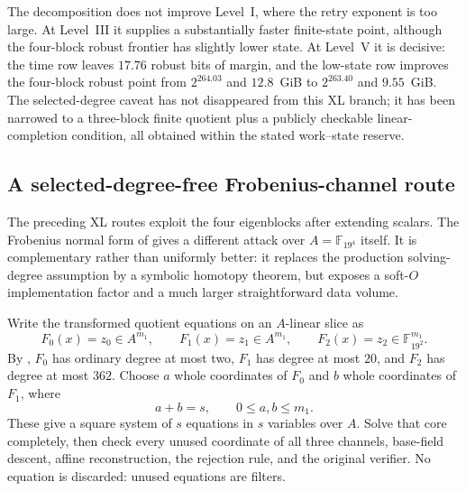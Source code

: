 \documentclass[11pt]{article}
\newcommand{\F}{\mathbb F}
\begin{document}
The decomposition does not improve Level~I, where the retry exponent is too
large.  At Level~III it supplies a substantially faster finite-state point,
although the four-block robust frontier has slightly lower state.  At
Level~V it is decisive: the time row leaves $17.76$ robust bits of margin, and
the low-state row improves the four-block robust point from $2^{264.03}$ and
$12.8$~GiB to $2^{263.40}$ and $9.55$~GiB.  The selected-degree caveat has not disappeared from this XL branch; it has
been narrowed to a three-block finite quotient plus a publicly checkable linear-completion
condition, all obtained within the stated work--state reserve.

\subsection{A selected-degree-free Frobenius-channel route}
\label{sec:channel-homotopy}

The preceding XL routes exploit the four eigenblocks after extending scalars.
The Frobenius normal form of  gives a different
attack over $A=\F_{19^4}$ itself.  It is complementary rather than uniformly
better: it replaces the production solving-degree assumption by a symbolic
homotopy theorem, but exposes a soft-$O$ implementation factor and a much
larger straightforward data volume.

Write the transformed quotient equations on an $A$-linear slice as
\[
 F_0(x)=z_0\in A^{m_1},\qquad
 F_1(x)=z_1\in A^{m_1},\qquad
 F_2(x)=z_2\in\F_{19^2}^{m_1}.
\]
By , $F_0$ has ordinary degree at most two,
$F_1$ has degree at most $20$, and $F_2$ has degree at most $362$.  Choose
$a$ whole coordinates of $F_0$ and $b$ whole coordinates of $F_1$, where
\begin{equation}\label{eq:channel-core-count}
 a+b=s,\qquad 0\le a,b\le m_1.
\end{equation}
These give a square system of $s$ equations in $s$ variables over $A$.  Solve
that core completely, then check every unused coordinate of all three channels,
base-field descent, affine reconstruction, the rejection rule, and the original
verifier.  No equation is discarded: unused equations are filters.
\end{document}
